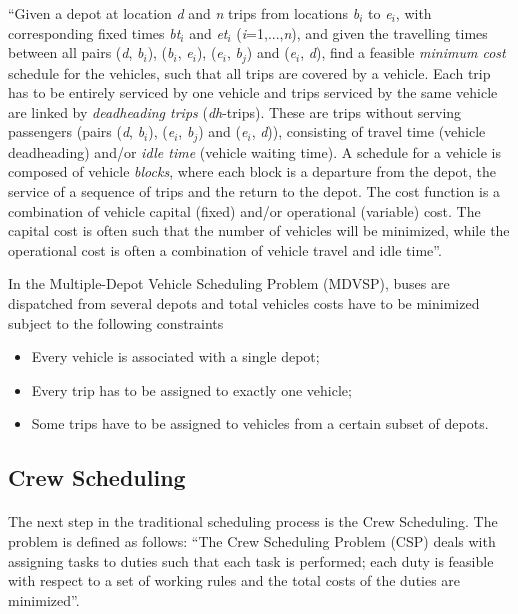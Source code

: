 “Given a depot at location \textit{d} and \textit{n} trips from locations \textit{b}$_i$ to \textit{e}$_i$, with corresponding fixed times \textit{bt}$_i$ and \textit{et}$_i$ (\textit{i}=1,...,\textit{n}),  and  given  the  travelling  times  between  all  pairs (\textit{d}, \textit{b}$_i$), (\textit{b}$_i$, \textit{e}$_i$), (\textit{e}$_i$, \textit{b}$_j$) and (\textit{e}$_i$, \textit{d}), find a feasible \textit{minimum cost} schedule for the vehicles, such that all trips are covered by a vehicle. Each trip has to be entirely serviced by one vehicle and trips serviced by the same vehicle are linked by \textit{deadheading trips} (\textit{dh}-trips).  These are trips without serving passengers (pairs (\textit{d}, \textit{b}$_i$), (\textit{e}$_i$, \textit{b}$_j$) and (\textit{e}$_i$, \textit{d})), consisting of travel time (vehicle deadheading) and/or \textit{idle time} (vehicle waiting time). A schedule for a vehicle is composed of vehicle \textit{blocks}, where each block is a departure from the depot, the service of a sequence of trips and the return to the depot. The cost function is a combination of vehicle capital (fixed) and/or operational (variable) cost. The capital cost is often such that the number of vehicles will be minimized, while the operational cost is often a combination of vehicle travel and idle time”.

In the Multiple-Depot Vehicle Scheduling Problem (MDVSP), buses are dispatched from several depots and total vehicles costs have to be minimized subject to the following constraints \cite{Huisman2004}

\begin {itemize}
\item Every vehicle is associated with a single depot; 
\item Every trip has to be assigned to exactly one vehicle; 
\item Some trips have to be assigned to vehicles from a certain subset of depots.
\end {itemize}

\subsection {Crew Scheduling}

\paragraph{ } The next step in the traditional scheduling process is the Crew Scheduling.  The problem is defined as follows: “The Crew Scheduling Problem (CSP) deals with assigning tasks to duties such that each task is performed; each duty is feasible with respect to a set of working rules and the total costs of the duties are minimized”. 

